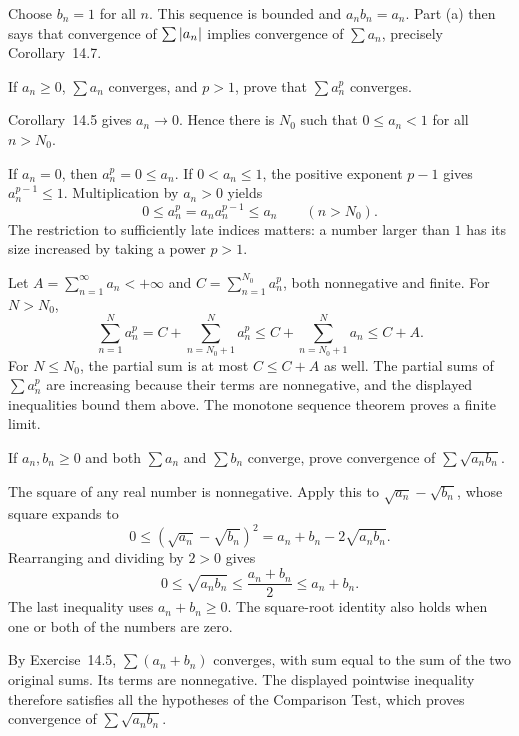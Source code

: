 Choose $b_n=1$ for all $n$. This sequence is bounded and
$a_nb_n=a_n$. Part (a) then says that convergence of
$\sum\left|a_n\right|$ implies convergence of $\sum a_n$, precisely
Corollary~14.7.

\goal If $a_n\ge0$, $\sum a_n$ converges, and $p>1$, prove that
$\sum a_n^p$ converges.

Corollary~14.5 gives $a_n\to0$. Hence there is $N_0$ such that
$0\le a_n<1$ for all $n>N_0$.

If $a_n=0$, then $a_n^p=0\le a_n$. If $0<a_n\le1$, the
positive exponent $p-1$ gives $a_n^{p-1}\le1$. Multiplication
by $a_n>0$ yields
\[
 0\le a_n^p=a_na_n^{p-1}\le a_n\qquad(n>N_0).
\]
The restriction to sufficiently late indices matters: a number
larger than $1$ has its size increased by taking a power $p>1$.

Let $A=\sum_{n=1}^{\infty}a_n<+\infty$ and
$C=\sum_{n=1}^{N_0}a_n^p$, both nonnegative and finite.
For $N>N_0$,
\[
 \sum_{n=1}^{N}a_n^p
 =C+\sum_{n=N_0+1}^{N}a_n^p
 \le C+\sum_{n=N_0+1}^{N}a_n\le C+A.
\]
For $N\le N_0$, the partial sum is at most $C\le C+A$ as well.
The partial sums of $\sum a_n^p$ are increasing because their
terms are nonnegative, and the displayed inequalities bound them
above. The monotone sequence theorem proves a finite limit.

\goal If $a_n,b_n\ge0$ and both $\sum a_n$ and $\sum b_n$
converge, prove convergence of $\sum\sqrt{a_nb_n}$.

The square of any real number is nonnegative. Apply this to
$\sqrt{a_n}-\sqrt{b_n}$, whose square expands to
\[
 0\le(\sqrt{a_n}-\sqrt{b_n})^2
   =a_n+b_n-2\sqrt{a_nb_n}.
\]
Rearranging and dividing by $2>0$ gives
\[
 0\le\sqrt{a_nb_n}\le\frac{a_n+b_n}{2}\le a_n+b_n.
\]
The last inequality uses $a_n+b_n\ge0$. The square-root identity
also holds when one or both of the numbers are zero.

By Exercise~14.5, $\sum(a_n+b_n)$ converges, with sum equal to
the sum of the two original sums. Its terms are nonnegative.
The displayed pointwise inequality therefore satisfies all the
hypotheses of the Comparison Test, which proves convergence of
$\sum\sqrt{a_nb_n}$.

